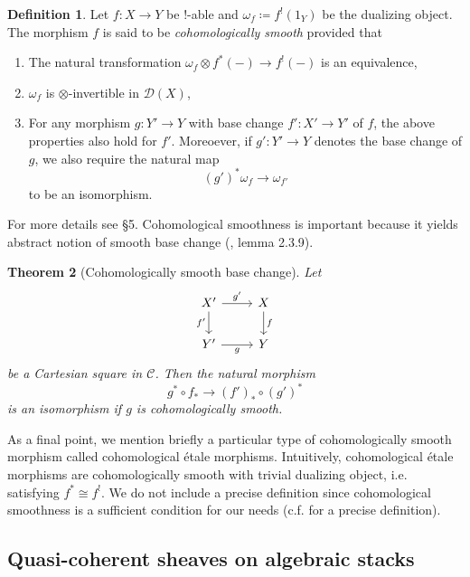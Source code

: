 \documentclass{article}
\newtheorem{theorem}{Theorem}[section]
\theoremstyle{definition}
\newtheorem{definition}[theorem]{Definition}
\theoremstyle{remark}
\begin{document}
\begin{definition} Let $f: X \to Y$ be $!$-able and $\omega_f \coloneqq f^! (1_Y)$ be the dualizing object. The morphism $f$ is said to be \emph{cohomologically smooth} provided that
\begin{enumerate}
  \item The natural transformation $\omega_f \otimes f^*(-) \to f^!(-)$ is an equivalence,
  \item  $\omega_f$ is $\otimes$-invertible in $\mathcal{D}(X)$,
  \item For any morphism $g: Y' \to Y$ with base change $f': X' \to Y'$ of $f$, the above properties also hold for $f'$. Moreoever, if $g': Y' \to Y$ denotes the base change of $g$, we also require the natural map $$(g')^* \omega_f \to \omega_{f'}$$ to be an isomorphism.
\end{enumerate}
\end{definition}
For more details see \cite{Sch22} \S 5. Cohomological smoothness is important because it yields abstract notion of smooth base change (\cite{Zavyalov2023}, lemma 2.3.9).
\begin{theorem}[Cohomologically smooth base change]\label{smooth base change} Let
\[\begin{tikzcd}
  {X'} & X \\
  {Y'} & Y
  \arrow["{g'}", from=1-1, to=1-2]
  \arrow["{f'}"', from=1-1, to=2-1]
  \arrow["f", from=1-2, to=2-2]
  \arrow["g"', from=2-1, to=2-2]
\end{tikzcd}\]
be a Cartesian square in $\mathcal{C}$. Then the natural morphism
$$g^* \circ f_* \to (f')_* \circ (g')^*$$
is an isomorphism if $g$ is cohomologically smooth.
\end{theorem}

As a final point, we mention briefly a particular type of cohomologically smooth morphism called cohomological étale morphisms. Intuitively, cohomological étale morphisms are cohomologically smooth with trivial dualizing object, i.e. satisfying $f^* \cong f^!$. We do not include a precise definition since cohomological smoothness is a sufficient condition for our needs  (c.f. \cite{Zavyalov2023} for a precise definition).


\subsection{Quasi-coherent sheaves on algebraic stacks}
\end{document}
